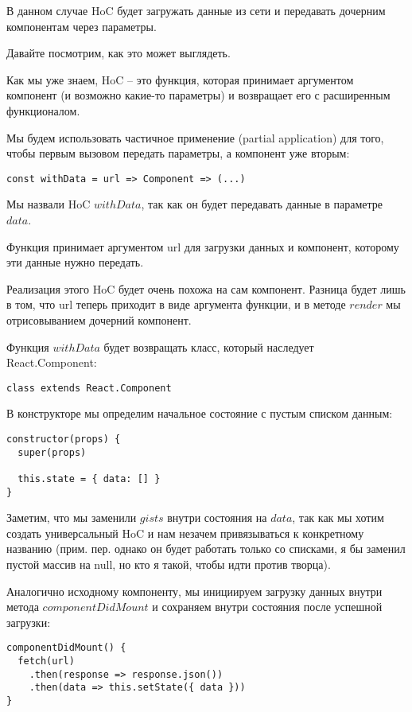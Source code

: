 В данном случае HoC будет загружать данные из сети и передавать дочерним компонентам через параметры.

Давайте посмотрим, как это может выглядеть.

Как мы уже знаем, HoC -- это функция, которая принимает аргументом компонент (и возможно какие-то параметры) и возвращает его с расширенным функционалом.

Мы будем использовать частичное применение (partial application) для того, чтобы первым вызовом передать параметры, а компонент уже вторым:

\begin{lstlisting}
const withData = url => Component => (...)
\end{lstlisting}

Мы назвали HoC $withData$, так как он будет передавать данные в параметре $data$. 

Функция принимает аргументом url для загрузки данных и компонент, которому эти данные нужно передать.

Реализация этого HoC будет очень похожа на сам компонент. Разница будет лишь в том, что url теперь приходит в виде аргумента функции, и в методе $render$ мы отрисовыванием дочерний компонент.

Функция $withData$ будет возвращать класс, который наследует React.Component:

\begin{lstlisting}
class extends React.Component
\end{lstlisting}

В конструкторе мы определим начальное состояние с пустым списком данным:

\begin{lstlisting}
constructor(props) {
  super(props)
  
  this.state = { data: [] }
}
\end{lstlisting}

Заметим, что мы заменили $gists$ внутри состояния на $data$, так как мы хотим создать универсальный HoC и нам незачем привязываться к конкретному названию (прим. пер. однако он будет работать только со списками, я бы заменил пустой массив на null, но кто я такой, чтобы идти против творца).

Аналогично исходному компоненту, мы инициируем загрузку данных внутри метода $componentDidMount$ и сохраняем внутри состояния после успешной загрузки:

\begin{lstlisting}
componentDidMount() {
  fetch(url)
    .then(response => response.json())
    .then(data => this.setState({ data }))
}
\end{lstlisting}

